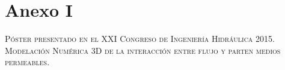 \chapter*{Anexo I}
\begin{center}
\large\scshape P\'oster presentado en el XXI Congreso de Ingenier\'ia Hidr\'aulica 2015.\\
\vspace{2 cm}
Modelaci\'on Num\'erica 3D de la interacci\'on entre flujo y part en medios permeables.
\end{center}

%



